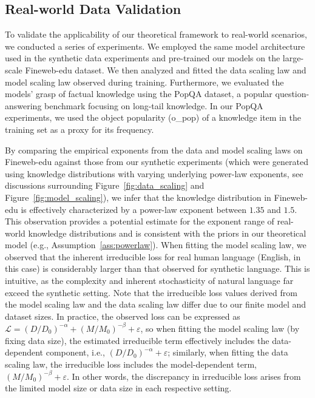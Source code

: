 \documentclass[11pt]{article}
\theoremstyle{plain}
\theoremstyle{definition}
\begin{document}
\begin{arxiv}
    \subsection{Real-world Data Validation}
\label{sec:real_world_validation}

To validate the applicability of our theoretical framework to real-world scenarios, we conducted a series of experiments. We employed the same model architecture used in the synthetic data experiments and pre-trained our models on the large-scale Fineweb-edu dataset. We then analyzed and fitted the data scaling law and model scaling law observed during training. Furthermore, we evaluated the models' grasp of factual knowledge using the PopQA dataset, a popular question-answering benchmark focusing on long-tail knowledge. In our PopQA experiments, we used the object popularity (o\_pop) of a knowledge item in the training set as a proxy for its frequency.

By comparing the empirical exponents from the data and model scaling laws on Fineweb-edu against those from our synthetic experiments (which were generated using knowledge distributions with varying underlying power-law exponents, see discussions surrounding Figure~\ref{fig:data_scaling} and Figure~\ref{fig:model_scaling}), we infer that the knowledge distribution in Fineweb-edu is effectively characterized by a power-law exponent between $1.35$ and $1.5$. This observation provides a potential estimate for the exponent range of real-world knowledge distributions and is consistent with the priors in our theoretical model (e.g., Assumption~\ref{ass:powerlaw}). When fitting the model scaling law, we observed that the inherent irreducible loss for real human language (English, in this case) is considerably larger than that observed for synthetic language. This is intuitive, as the complexity and inherent stochasticity of natural language far exceed the synthetic setting. Note that the irreducible loss values derived from the model scaling law and the data scaling law differ due to our finite model and dataset sizes. In practice, the observed loss can be expressed as $\mathcal{L} = (D/D_0)^{-\alpha} + (M/M_0)^{-\beta} + \varepsilon$, so when fitting the model scaling law (by fixing data size), the estimated irreducible term effectively includes the data-dependent component, i.e., $(D/D_0)^{-\alpha} + \varepsilon$; similarly, when fitting the data scaling law, the irreducible loss includes the model-dependent term, $(M/M_0)^{-\beta} + \varepsilon$. In other words, the discrepancy in irreducible loss arises from the limited model size or data size in each respective setting.


\end{arxiv}
\end{document}
